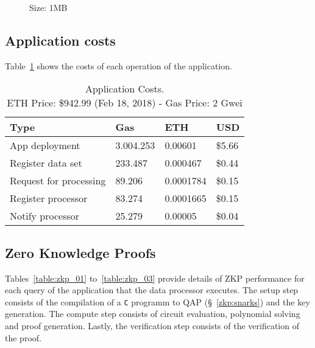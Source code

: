 \begin{figure}
  \centering
  \caption{Size: 1MB}
  \label{}
\end{figure}

\clearpage

\subsection{Application costs}
\label{evaluation:app_costs}

Table~\ref{table:app_costs} shows the costs of each operation of the application.

\begin{table}[!htb]
\centering
\begin{tabular}{|l|l|l|l|}
\hline
 Type & Gas & ETH & USD \\ \hline
 App deployment & 3.004.253 & 0.00601 & \$5.66 \\ \hline
 Register data set & 233.487 & 0.000467 & \$0.44 \\ \hline
 Request for processing & 89.206 & 0.0001784 & \$0.15 \\ \hline
 Register processor & 83.274 & 0.0001665 & \$0.15 \\ \hline
 Notify processor & 25.279 & 0.00005 & \$0.04 \\ \hline
\end{tabular}
\captionsetup{format=hang, justification=centering}
\caption{Application Costs.\\ ETH Price: \$942.99 (Feb 18, 2018) - Gas Price: 2 Gwei}
\label{table:app_costs}
\end{table}

\subsection{Zero Knowledge Proofs}
\label{evaluation:zkp}

Tables~\ref{table:zkp_01} to~\ref{table:zkp_03} provide details of ZKP performance for each query of the application that the data processor executes. The setup step consists of the compilation of a \verb|C| programm to QAP (§~\ref{zkp:snarks}) and the key generation. The compute step consists of circuit evaluation, polynomial solving and proof generation. Lastly, the verification step consists of the verification of the proof.

